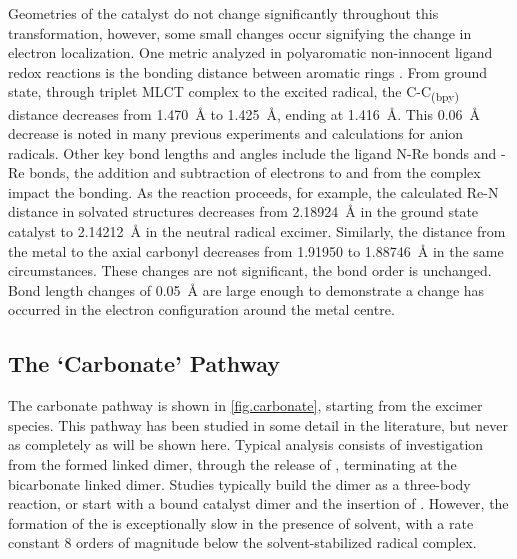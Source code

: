 


Geometries of the catalyst do not change significantly throughout this transformation, however, some small changes occur signifying the change in electron localization. One metric analyzed in polyaromatic non-innocent ligand redox reactions is the bonding distance between aromatic rings \autocite{bokarev2014}. From ground state, through triplet MLCT complex to the excited radical, the C-C\textsubscript{(bpy)} distance decreases from 1.470~\r{A} to 1.425~\r{A}, ending at 1.416~\r{A}. This 0.06~\r{A} decrease is noted in many previous experiments and calculations for anion radicals\autocite{bokarev2014, chisholm1981, castellaventura2000, gorerandall2009, irwin2010}. Other key bond lengths and angles include the ligand N-Re bonds and -Re bonds, the addition and subtraction of electrons to and from the complex impact the bonding. As the reaction proceeds, for example, the calculated Re-N distance in solvated structures decreases from 2.18924~\r{A} in the ground state catalyst to 2.14212~\r{A} in the neutral radical excimer. Similarly, the distance from the metal to the axial carbonyl decreases from 1.91950 to 1.88746~\r{A} in the same circumstances. These changes are not significant, the bond order is unchanged. Bond length changes of 0.05~\r{A} are large enough to demonstrate a change has occurred in the electron configuration around the metal centre. 

\subsection{The `Carbonate' Pathway}\label{ss.carbonate}

The carbonate pathway is shown in \autoref{fig.carbonate}, starting from the excimer species. This pathway has been studied in some detail in the literature, but never as completely as will be shown here. Typical analysis consists of investigation from the formed  linked dimer, through the release of , terminating at the bicarbonate linked dimer. Studies typically build the dimer as a three-body reaction, or start with a  bound catalyst dimer and the insertion of . However, the formation of the   is exceptionally slow in the presence of solvent, with a rate constant 8 orders of magnitude below the solvent-stabilized radical  complex\autocite{fujita2004}. 

